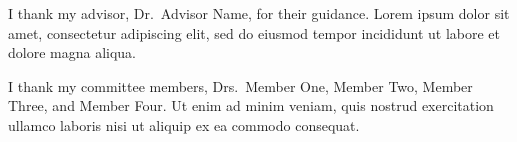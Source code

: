%
%

I thank my advisor, Dr.\ Advisor Name, for their guidance. Lorem ipsum dolor sit amet, consectetur adipiscing elit, sed do eiusmod tempor incididunt ut labore et dolore magna aliqua.

I thank my committee members, Drs.\ Member One, Member Two, Member Three, and Member Four. Ut enim ad minim veniam, quis nostrud exercitation ullamco laboris nisi ut aliquip ex ea commodo consequat.
